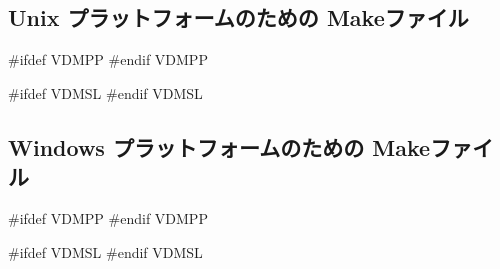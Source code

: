 \documentclass[\pformat,12pt]{jarticle}
\begin{document}
\subsection{Unix プラットフォームのための Makeファイル}

#ifdef VDMPP
#endif VDMPP

#ifdef VDMSL
#endif VDMSL

\subsection{Windows プラットフォームのための Makeファイル}

#ifdef VDMPP
#endif VDMPP

#ifdef VDMSL
#endif VDMSL

%
%
%
\end{document}
